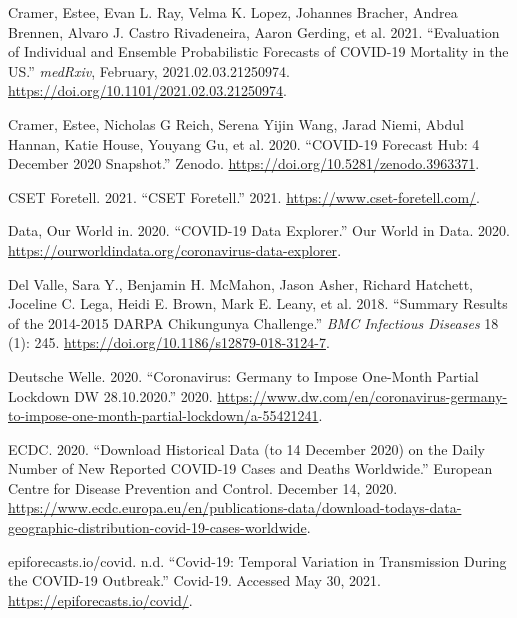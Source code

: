 \documentclass[
]{article}
\newlength{\cslhangindent}
\newlength{\cslentryspacingunit} %
\newenvironment{CSLReferences}[2] %
 {%
  \setlength{\parindent}{0pt}
  \ifodd #1
  \let\oldpar\par
  \def\par{\hangindent=\cslhangindent\oldpar}
  \fi
  \setlength{\parskip}{#2\cslentryspacingunit}
 }%
 {}
\begin{document}
\begin{CSLReferences}{1}{0}
\leavevmode{}%
Cramer, Estee, Evan L. Ray, Velma K. Lopez, Johannes Bracher, Andrea Brennen, Alvaro J. Castro Rivadeneira, Aaron Gerding, et al. 2021. {``Evaluation of Individual and Ensemble Probabilistic Forecasts of {COVID}-19 Mortality in the {US}.''} \emph{medRxiv}, February, 2021.02.03.21250974. \url{https://doi.org/10.1101/2021.02.03.21250974}.

\leavevmode{}%
Cramer, Estee, Nicholas G Reich, Serena Yijin Wang, Jarad Niemi, Abdul Hannan, Katie House, Youyang Gu, et al. 2020. {``{COVID}-19 {Forecast Hub}: 4 {December} 2020 Snapshot.''} {Zenodo}. \url{https://doi.org/10.5281/zenodo.3963371}.

\leavevmode{}%
CSET Foretell. 2021. {``{CSET Foretell}.''} 2021. \url{https://www.cset-foretell.com/}.

\leavevmode{}%
Data, Our World in. 2020. {``{COVID}-19 {Data Explorer}.''} {Our World in Data}. 2020. \url{https://ourworldindata.org/coronavirus-data-explorer}.

\leavevmode{}%
Del Valle, Sara Y., Benjamin H. McMahon, Jason Asher, Richard Hatchett, Joceline C. Lega, Heidi E. Brown, Mark E. Leany, et al. 2018. {``Summary Results of the 2014-2015 {DARPA Chikungunya} Challenge.''} \emph{BMC Infectious Diseases} 18 (1): 245. \url{https://doi.org/10.1186/s12879-018-3124-7}.

\leavevmode{}%
Deutsche Welle. 2020. {``Coronavirus: Germany to Impose One-Month Partial Lockdown \textbar{} {DW} \textbar{} 28.10.2020.''} 2020. \url{https://www.dw.com/en/coronavirus-germany-to-impose-one-month-partial-lockdown/a-55421241}.

\leavevmode{}%
ECDC. 2020. {``Download Historical Data (to 14 {December} 2020) on the Daily Number of New Reported {COVID}-19 Cases and Deaths Worldwide.''} {European Centre for Disease Prevention and Control}. December 14, 2020. \url{https://www.ecdc.europa.eu/en/publications-data/download-todays-data-geographic-distribution-covid-19-cases-worldwide}.

\leavevmode{}%
epiforecasts.io/covid. n.d. {``Covid-19: Temporal Variation in Transmission During the {COVID}-19 Outbreak.''} {Covid-19}. Accessed May 30, 2021. \url{https://epiforecasts.io/covid/}.


\end{CSLReferences}
\end{document}
